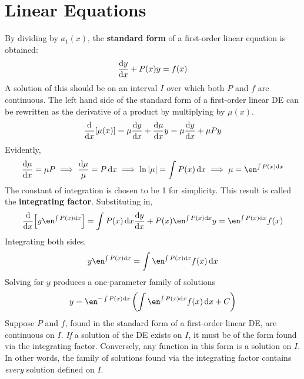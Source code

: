 \documentclass[./Differential Equations.tex]{subfiles}
\begin{document}
	\section{Linear Equations}
			By dividing by \(a_1(x)\), the \textbf{standard form} of a first-order linear equation is obtained:
				\[\dv{y}{x} + P(x)y = f(x)\]
				A solution of this should be on an interval \(I\) over which both \(P\) and \(f\) are continuous.
			The left hand side of the standard form of a first-order linear DE can be rewritten as the derivative of a product by multiplying by \(\mu(x)\).
			\[\dv{}{x}[\mu(x)] = \mu\dv{y}{x} + \dv{\mu}{x}y = \mu\dv{y}{x} + \mu Py\]
			Evidently,
			\[
				\dv{\mu}{x} = \mu P \implies 
					\frac{\dd{\mu}}{\mu} = P \dd{x} \implies
					\ln|\mu| = \int P(x)\dd{x} \implies
					\mu = \en^{\int P(x)\dd{x}}
			\]
			The constant of integration is chosen to be 1 for simplicity. This result is called the \textbf{integrating factor}. Substituting in,
			\[
				\dv{}{x}{\Bigl[y\en^{\int P(x)\dd{x}}\Bigr] = \int P(x)\dd{x}}\dv{y}{x} + P(x)\en^{\int P(x)\dd{x}}y = \en^{\int P(x)\dd{x}}f(x)
			\]
			Integrating both sides,
			\[y\en^{\int P(x)\dd{x}} = \int \en^{\int P(x)\dd{x}}f(x)\dd{x}\]
			Solving for \(y\) produces a one-parameter family of solutions
			\[y = \en^{-\int P(x)\dd{x}}\left(\int \en^{\int P(x)\dd{x}}f(x)\dd{x} + C\right)\]
			Suppose \(P\) and \(f\), found in the standard form of a first-order linear DE, are continuous on \(I\). \textit{If} a solution of the DE exists on \(I\), it must be of the form found via the integrating factor. Conversely, any function in this form is a solution on \(I\). In other words, the family of solutions found via the integrating factor contains \textit{every} solution defined on \(I\).
\end{document}
